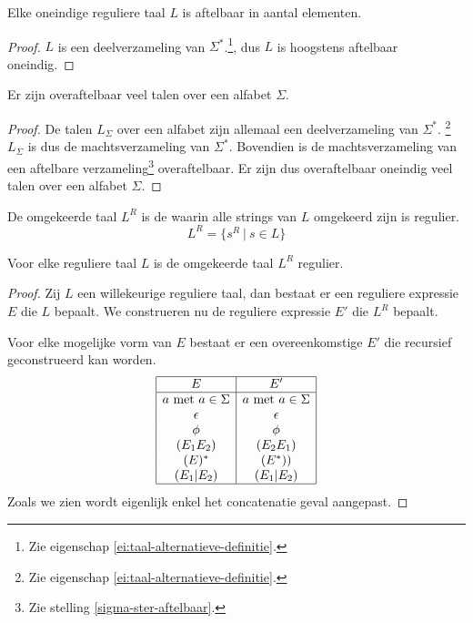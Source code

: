 \documentclass[main.tex]{subfiles}
\begin{document}
\begin{st}
  Elke oneindige reguliere taal $L$ is aftelbaar in aantal elementen.

  \begin{proof}
    $L$ is een deelverzameling van $\Sigma^{*}$.\footnote{Zie eigenschap \ref{ei:taal-alternatieve-definitie}.}, dus $L$ is hoogstens aftelbaar oneindig.
  \end{proof}
\end{st}

\begin{st}
  Er zijn overaftelbaar veel talen over een alfabet $\Sigma$.

  \begin{proof}
    De talen $L_{\Sigma}$ over een alfabet zijn allemaal een deelverzameling van $\Sigma^{*}$. \footnote{Zie eigenschap \ref{ei:taal-alternatieve-definitie}.} $L_{\Sigma}$ is dus de machtsverzameling van $\Sigma^{*}$.
    Bovendien is de machtsverzameling van een aftelbare verzameling\footnote{Zie stelling \ref{sigma-ster-aftelbaar}.} overaftelbaar.
    Er zijn dus overaftelbaar oneindig veel talen over een alfabet $\Sigma$.
  \end{proof}
\end{st}

\begin{de}
  De omgekeerde taal $L^{R}$ is de waarin alle strings van $L$ omgekeerd zijn is regulier.
  \[ L^{R} = \{ s^{R}\ |\ s \in L \} \]
\end{de}

\begin{st}
  Voor elke reguliere taal $L$ is de omgekeerde taal $L^{R}$ regulier.

  \begin{proof}
    Zij $L$ een willekeurige reguliere taal, dan bestaat er een reguliere expressie $E$ die $L$ bepaalt.
    We construeren nu de reguliere expressie $E'$ die $L^{R}$ bepaalt.
    
    Voor elke mogelijke vorm van $E$ bestaat er een overeenkomstige $E'$ die recursief geconstrueerd kan worden.
    \[
    \begin{array}{|c|c|}
      \hline
      E                           & E'\\
      \hline
      a \text{ met } a \in \Sigma & a \text{ met } a \in \Sigma\\
      \epsilon                    & \epsilon\\
      \phi                        & \phi\\
      (E_1E_2)                    & (E_{2}E_{1})\\
      (E)^{*}                      & (E^{*}))\\
      (E_1|E_2)                   & (E_1|E_2)\\
      \hline
    \end{array}
    \]
    Zoals we zien wordt eigenlijk enkel het concatenatie geval aangepast. 
  \end{proof}
\end{st}
\end{document}
